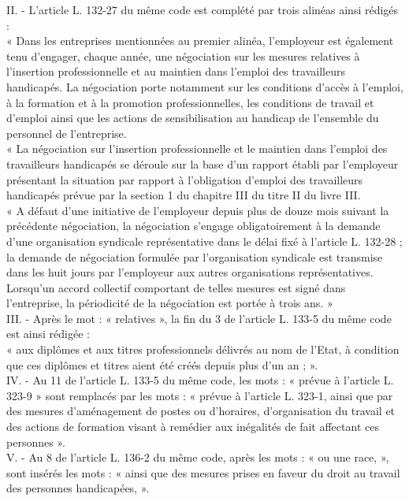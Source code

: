 II. - L'article L. 132-27 du même code est complété par trois alinéas ainsi rédigés :\\
« Dans les entreprises mentionnées au premier alinéa, l'employeur est également tenu d'engager, chaque année, une négociation sur les mesures relatives à l'insertion professionnelle et au maintien dans l'emploi des travailleurs handicapés. La négociation porte notamment sur les conditions d'accès à l'emploi, à la formation et à la promotion professionnelles, les conditions de travail et d'emploi ainsi que les actions de sensibilisation au handicap de l'ensemble du personnel de l'entreprise.\\
« La négociation sur l'insertion professionnelle et le maintien dans l'emploi des travailleurs handicapés se déroule sur la base d'un rapport établi par l'employeur présentant la situation par rapport à l'obligation d'emploi des travailleurs handicapés prévue par la section 1 du chapitre III du titre II du livre III.\\
« A défaut d'une initiative de l'employeur depuis plus de douze mois suivant la précédente négociation, la négociation s'engage obligatoirement à la demande d'une organisation syndicale représentative dans le délai fixé à l'article L. 132-28 ; la demande de négociation formulée par l'organisation syndicale est transmise dans les huit jours par l'employeur aux autres organisations représentatives. Lorsqu'un accord collectif comportant de telles mesures est signé dans l'entreprise, la périodicité de la négociation est portée à trois ans. »\\

III. - Après le mot : « relatives », la fin du 3 de l'article L. 133-5 du même code est ainsi rédigée : \\
« aux diplômes et aux titres professionnels délivrés au nom de l'Etat, à condition que ces diplômes et titres aient été créés depuis plus d'un an ; ».\\

IV. - Au 11 de l'article L. 133-5 du même code, les mots : « prévue à l'article L. 323-9 » sont remplacés par les mots : « prévue à l'article L. 323-1, ainsi que par des mesures d'aménagement de postes ou d'horaires, d'organisation du travail et des actions de formation visant à remédier aux inégalités de fait affectant ces personnes ».\\

V. - Au 8 de l'article L. 136-2 du même code, après les mots : « ou une race, », sont insérés les mots : « ainsi que des mesures prises en faveur du droit au travail des personnes handicapées, ».\\

